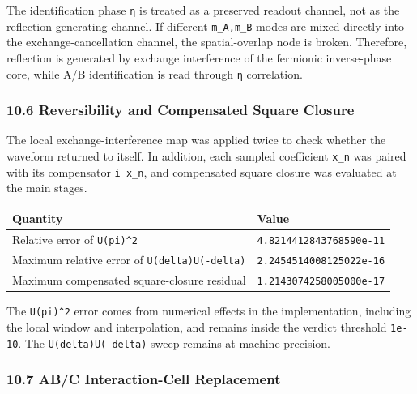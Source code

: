 \documentclass[
  a4paper,
]{article}
\newcounter{none} %
\begin{document}
The identification phase \texttt{η} is treated as a preserved readout
channel, not as the reflection-generating channel. If different
\texttt{m\_A,m\_B} modes are mixed directly into the
exchange-cancellation channel, the spatial-overlap node is broken.
Therefore, reflection is generated by exchange interference of the
fermionic inverse-phase core, while A/B identification is read through
\texttt{η} correlation.

\subsubsection{10.6 Reversibility and Compensated Square
Closure}\label{reversibility-and-compensated-square-closure}

The local exchange-interference map was applied twice to check whether
the waveform returned to itself. In addition, each sampled coefficient
\texttt{x\_n} was paired with its compensator \texttt{i\ x\_n}, and
compensated square closure was evaluated at the main stages.

{\def\LTcaptype{none} %
\begin{longtable}[]{@{}
  >{\raggedright\arraybackslash}p{}
  >{\raggedleft\arraybackslash}p{}@{}}
\toprule\noalign{}
\begin{minipage}[b]{\linewidth}\raggedright
Quantity
\end{minipage} & \begin{minipage}[b]{\linewidth}\raggedleft
Value
\end{minipage} \\
\midrule\noalign{}
\endhead
\bottomrule\noalign{}
\endlastfoot
Relative error of \texttt{U(pi)\^{}2} &
\texttt{4.8214412843768590e-11} \\
Maximum relative error of \texttt{U(delta)U(-delta)} &
\texttt{2.2454514008125022e-16} \\
Maximum compensated square-closure residual &
\texttt{1.2143074258005000e-17} \\
\end{longtable}
}

The \texttt{U(pi)\^{}2} error comes from numerical effects in the
implementation, including the local window and interpolation, and
remains inside the verdict threshold \texttt{1e-10}. The
\texttt{U(delta)U(-delta)} sweep remains at machine precision.

\subsubsection{10.7 AB/C Interaction-Cell
Replacement}\label{abc-interaction-cell-replacement}
\end{document}
